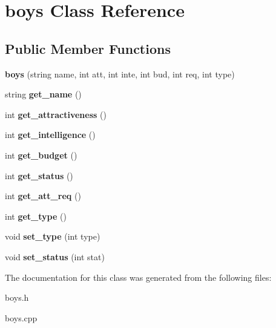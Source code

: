 \hypertarget{classboys}{}\section{boys Class Reference}
\label{classboys}
\subsection*{Public Member Functions}
\begin{DoxyCompactItemize}
\item 
{\bfseries boys} (string name, int att, int inte, int bud, int req, int type)\hypertarget{classboys_afc13291eb5dbef3d2bfcbdcfd752329f}{}\label{classboys_afc13291eb5dbef3d2bfcbdcfd752329f}

\item 
string {\bfseries get\+\_\+name} ()\hypertarget{classboys_a160b339d043b658f97dc47c55cf15009}{}\label{classboys_a160b339d043b658f97dc47c55cf15009}

\item 
int {\bfseries get\+\_\+attractiveness} ()\hypertarget{classboys_ad5f41ef5afeb73f360915a4fdf7f402a}{}\label{classboys_ad5f41ef5afeb73f360915a4fdf7f402a}

\item 
int {\bfseries get\+\_\+intelligence} ()\hypertarget{classboys_a21fe1d95677d889b56dfcc892ccc6eef}{}\label{classboys_a21fe1d95677d889b56dfcc892ccc6eef}

\item 
int {\bfseries get\+\_\+budget} ()\hypertarget{classboys_a02e8903995ea8be01af8416927ba3108}{}\label{classboys_a02e8903995ea8be01af8416927ba3108}

\item 
int {\bfseries get\+\_\+status} ()\hypertarget{classboys_aa4bba32fb8a0fea663d324d949c8679f}{}\label{classboys_aa4bba32fb8a0fea663d324d949c8679f}

\item 
int {\bfseries get\+\_\+att\+\_\+req} ()\hypertarget{classboys_ac576d48f083637800edb0662af6b782e}{}\label{classboys_ac576d48f083637800edb0662af6b782e}

\item 
int {\bfseries get\+\_\+type} ()\hypertarget{classboys_af62f8602a521109c1184eb925b64e315}{}\label{classboys_af62f8602a521109c1184eb925b64e315}

\item 
void {\bfseries set\+\_\+type} (int type)\hypertarget{classboys_a3ef296221ee0bc92abd3a604e65e0678}{}\label{classboys_a3ef296221ee0bc92abd3a604e65e0678}

\item 
void {\bfseries set\+\_\+status} (int stat)\hypertarget{classboys_af4151082481ae83f0aeb47e1f4b9b9d9}{}\label{classboys_af4151082481ae83f0aeb47e1f4b9b9d9}

\end{DoxyCompactItemize}


The documentation for this class was generated from the following files\+:\begin{DoxyCompactItemize}
\item 
boys.\+h\item 
boys.\+cpp\end{DoxyCompactItemize}

